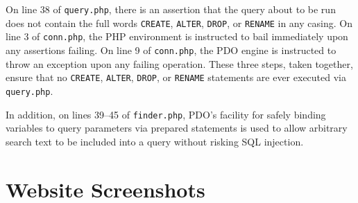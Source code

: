 \documentclass[american,extrafontsizes,12pt,portrait,letterpaper,oneside,onecolumn,final]{memoir}
\begin{document}
On line 38 of \texttt{query.php}, there is an assertion that the query about to be run does not contain the full words \texttt{CREATE}, \texttt{ALTER}, \texttt{DROP}, or \texttt{RENAME} in any casing.
On line 3 of \texttt{conn.php}, the PHP environment is instructed to bail immediately upon any assertions failing.
On line 9 of \texttt{conn.php}, the PDO engine is instructed to throw an exception upon any failing operation.
These three steps, taken together, ensure that no \texttt{CREATE}, \texttt{ALTER}, \texttt{DROP}, or \texttt{RENAME} statements are ever executed via \texttt{query.php}.

In addition, on lines 39--45 of \texttt{finder.php}, PDO's facility for safely binding variables to query parameters via prepared statements is used to allow arbitrary search text to be included into a query without risking SQL injection.

\section{Website Screenshots}
\end{document}

